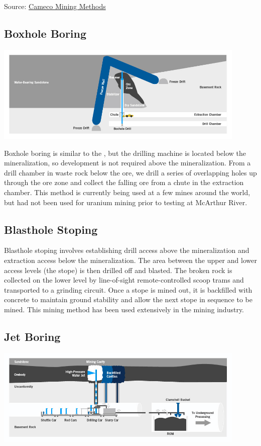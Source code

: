 Source: \href{https://www.cameco.com/businesses/mining-methods}{Cameco Mining Methods}

\subsection*{Boxhole Boring}
\label{ssec_boxbore}
\includegraphics[width=0.9\textwidth]{img/cameco/3.0.1-1MiningMethods-Boxhole.jpg}

Boxhole boring is similar to the , but the drilling machine is located below the mineralization, so development is not required above the mineralization. From a drill chamber in waste rock below the ore, we drill a series of overlapping holes up through the ore zone and collect the falling ore from a chute in the extraction chamber. This method is currently being used at a few mines around the world, but had not been used for uranium mining prior to testing at McArthur River.
\subsection*{Blasthole Stoping}


Blasthole stoping involves establishing drill access above the mineralization and extraction access below the mineralization. The area between the upper and lower access levels (the stope) is then drilled off and blasted. The broken rock is collected on the lower level by line-of-sight remote-controlled scoop trams and transported to a grinding circuit. Once a stope is mined out, it is backfilled with concrete to maintain ground stability and allow the next stope in sequence to be mined. This mining method has been used extensively in the mining industry.
\subsection*{Jet Boring}
\label{ssec_jetbore}
\includegraphics[width=0.9\textwidth]{img/cameco/3.0.1-2MiningMethods-JetBore.jpg}

